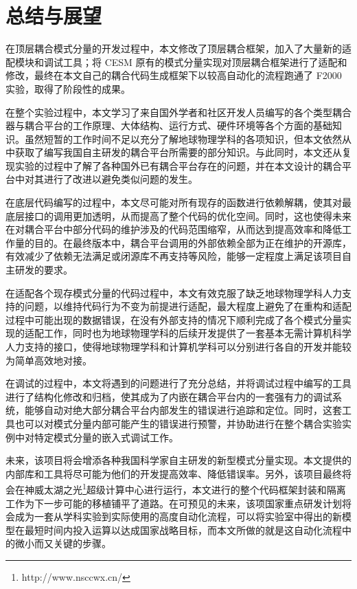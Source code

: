 \chapter{总结与展望}
\label{cha:further}

在顶层耦合模式分量的开发过程中，本文修改了顶层耦合框架，加入了大量新的适配模块和调试工具；将 CESM 原有的模式分量实现对顶层耦合框架进行了适配和修改，最终在本文自己的耦合代码生成框架下以较高自动化的流程跑通了 F2000 实验，取得了阶段性的成果。

在整个实验过程中，本文学习了来自国外学者和社区开发人员编写的各个类型耦合器与耦合平台的工作原理、大体结构、运行方式、硬件环境等各个方面的基础知识。虽然短暂的工作时间不足以充分了解地球物理学科的各项知识，但本文依然从中获取了编写我国自主研发的耦合平台所需要的部分知识。与此同时，本文还从复现实验的过程中了解了各种国外已有耦合平台存在的问题，并在本文设计的耦合平台中对其进行了改进以避免类似问题的发生。

在底层代码编写的过程中，本文尽可能对所有现存的函数进行依赖解耦，使其对最底层接口的调用更加透明，从而提高了整个代码的优化空间。同时，这也使得未来在对耦合平台中部分代码的维护涉及的代码范围缩窄，从而达到提高效率和降低工作量的目的。在最终版本中，耦合平台调用的外部依赖全部为正在维护的开源库，有效减少了依赖无法满足或闭源库不再支持等风险，能够一定程度上满足该项目自主研发的要求。

在适配各个现存模式分量的代码过程中，本文有效克服了缺乏地球物理学科人力支持的问题，以维持代码行为不变为前提进行适配，最大程度上避免了在重构和适配过程中可能出现的数据错误，在没有外部支持的情况下顺利完成了各个模式分量实现的适配工作，同时也为地球物理学科的后续开发提供了一套基本无需计算机科学人力支持的接口，使得地球物理学科和计算机学科可以分别进行各自的开发并能较为简单高效地对接。

在调试的过程中，本文将遇到的问题进行了充分总结，并将调试过程中编写的工具进行了结构化修改和归档，使其成为了内嵌在耦合平台内的一套强有力的调试系统，能够自动对绝大部分耦合平台内部发生的错误进行追踪和定位。同时，这套工具也可以对模式分量内部可能产生的错误进行预警，并协助进行在整个耦合实验实例中对特定模式分量的嵌入式调试工作。

未来，该项目将会增添各种我国科学家自主研发的新型模式分量实现。本文提供的内部库和工具将尽可能为他们的开发提高效率、降低错误率。另外，该项目最终将会在神威太湖之光\footnote{http://www.nsccwx.cn/}超级计算中心进行运行，本文进行的整个代码框架封装和隔离工作为下一步可能的移植铺平了道路。在可预见的未来，该项国家重点研发计划将会成为一套从学科实验到实际使用的高度自动化流程，可以将实验室中得出的新模型在最短时间内投入运算以达成国家战略目标，而本文所做的就是这自动化流程中的微小而又关键的步骤。
